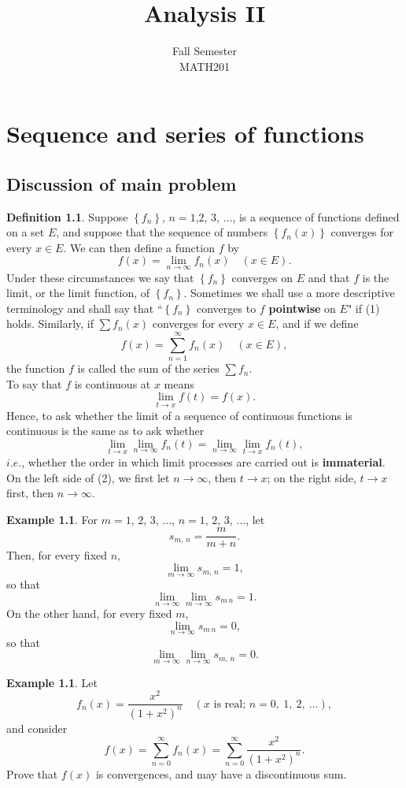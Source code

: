 \documentclass[12pt]{book}
\title{Analysis II}
\author{Fall Semester\\MATH201}
\date{}
\theoremstyle{definition}
\newtheorem{definition}[theorem]{Definition}
\newtheorem{example}[theorem]{Example}
\begin{document}
	\chapter{Sequence and series of functions}
	\listoftheorems
	\newpage
	\section*{Discussion of main problem}
	\begin{definition}
		Suppose $\left\{f_n\right\}$, $n=1$,$2$, $3$, $\ldots$, is a sequence of functions defined on a set $E$, and suppose that the sequence of numbers $\left\{f_n(x)\right\}$ converges for every $x\in E$. We can then define a function $f$ by \begin{equation}
			f(x)=\lim_{n\rightarrow \infty}f_n(x)\quad (x\in E).
		\end{equation}
		Under these circumstances we say that $\left\{f_n\right\}$ converges on $E$ and that $f$ is the limit, or the limit function, of $\left\{f_n\right\}$. Sometimes we shall use a more descriptive terminology and shall say that ``$\left\{f_n\right\}$ converges to $f$ \textbf{pointwise} on $E$" if (1) holds. Similarly, if $\sum f_n(x)$ converges for every $x\in E$, and if we define $$f(x)=\displaystyle\sum_{n=1}^{\infty} f_n(x)\quad (x\in E),$$
		the function $f$ is called the sum of the series $\sum f_n$.\\
		To say that $f$ is continuous at $x$ means $$\lim_{t\rightarrow x}f(t)=f(x).$$
		Hence, to ask whether the limit of a sequence of continuous functions is continuous is the same as to ask whether \begin{equation}
			\lim_{t\rightarrow x}\lim_{n\rightarrow \infty}f_n(t)=\lim_{n\rightarrow \infty}\lim_{t\rightarrow x} f_n(t),
		\end{equation}
		$i.e.$, whether the order in which limit processes are carried out is \textbf{immaterial}. On the left side of (2), we first let $n\rightarrow \infty$, then $t \rightarrow x$; on the right side, $t\rightarrow x$ first, then $n\rightarrow \infty$.
	\end{definition}
	\newpage
	\begin{example}
		For $m=1$, $2$, $3$, $\ldots$, $n=1$, $2$, $3$, $\ldots$, let $$s_{m,\,n}=\dfrac{m}{m+n}.$$
		Then, for every fixed $n$, $$\lim_{m\rightarrow \infty}s_{m,\,n}=1,$$ so that $$\lim_{n\rightarrow\infty}\lim_{m\rightarrow\infty}s_{m\,n}=1.$$ On the other hand, for every fixed $m$, $$\lim_{n\rightarrow\infty}s_{m\,n}=0,$$ so that $$\lim_{m\rightarrow \infty}\lim_{n\rightarrow\infty}s_{m,\,n}=0.$$
	\end{example}
	\vfill
	\begin{example}
		Let $$f_n(x)=\dfrac{x^2}{(1+x^2)^n}\quad (x \text{ is real; }n=0,~1,~2,~\ldots),$$
		and consider $$f(x)=\displaystyle\sum_{n=0}^{\infty} f_n(x)=\displaystyle\sum_{n=0}^{\infty}\dfrac{x^2}{(1+x^2)^n}.$$
		Prove that $f(x)$ is convergences, and may have a discontinuous sum.
	\end{example}
	\vfill
	\newpage
\end{document}
